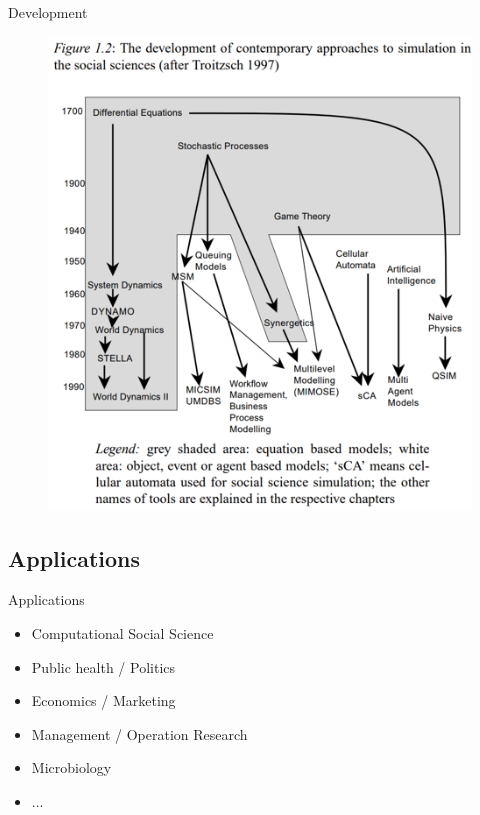 \documentclass[compress]{beamer}
\begin{document}
\begin{frame}{Development}
        \begin{figure}
            \centering
            \includegraphics[scale=0.5]{SocialScienceSimDev.png}
            \label{fig:my_label}
        \end{figure}
\end{frame}

\subsection{Applications}
\begin{frame}{Applications}
    \begin{itemize}
        \item<1-> Computational Social Science
        \item<2-> Public health / Politics
        \item<3-> Economics / Marketing
        \item<4-> Management / Operation Research
        \item<5-> Microbiology
        \item<5-> ...
    \end{itemize}
\end{frame}
\end{document}
